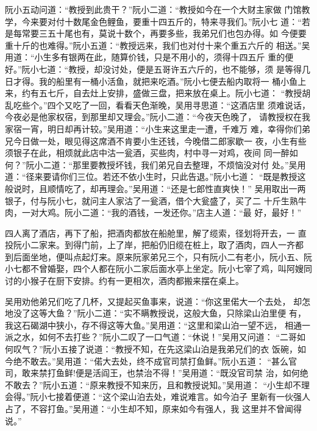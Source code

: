 阮小五动问道：“教授到此贵干？”阮小二道：“教授如今在一个大财主家做
门馆教学，今来要对付十数尾金色鲤鱼，要重十四五斤的，特来寻我们。”阮小七
道：“若是每常要三五十尾也有，莫说十数个，再要多些，我弟兄们也包办得。如
今便要重十斤的也难得。”阮小五道：“教授远来，我们也对付十来个重五六斤的
相送。”吴用道：“小生多有银两在此，随算价钱，只是不用小的，须得十四五斤
重的便好。”阮小七道：“教授，却没讨处，便是五哥许五六斤的，也不能够，须
是等得几日才得。我的船里有一桶小活鱼，就把来吃酒。”阮小七便去船内取将一
桶小鱼上来，约有五七斤，自去灶上安排，盛做三盘，把来放在桌上。阮小七道：
“教授胡乱吃些个。”四个又吃了一回，看看天色渐晚，吴用寻思道：“这酒店里
须难说话，今夜必是他家权宿，到那里却又理会。”阮小二道：“今夜天色晚了，
请教授权在我家宿一宵，明日却再计较。”吴用道：“小生来这里走一遭，千难万
难，幸得你们弟兄今日做一处，眼见得这席酒不肯要小生还钱，今晚借二郎家歇一
夜，小生有些须银子在此，相烦就此店中沽一瓮酒，买些肉，村中寻一对鸡，夜间
同一醉如何？”阮小二道：“那里要教授坏钱，我们弟兄自去整理，不烦恼没对付
处。”吴用道：“径来要请你们三位。若还不依小生时，只此告退。”阮小七道：
“既是教授这般说时，且顺情吃了，却再理会。”吴用道：“还是七郎性直爽快！”
吴用取出一两银子，付与阮小七，就问主人家沽了一瓮酒，借个大瓮盛了，买了二
十斤生熟牛肉，一对大鸡。阮小二道：“我的酒钱，一发还你。”店主人道：“最
好，最好！”

四人离了酒店，再下了船，把酒肉都放在船舱里，解了缆索，径划将开去，一
直投阮小二家来。到得门前，上了岸，把船仍旧缆在桩上，取了酒肉，四人一齐都
到后面坐地，便叫点起灯来。原来阮家弟兄三个，只有阮小二有老小，阮小五、阮
小七都不曾婚娶，四个人都在阮小二家后面水亭上坐定。阮小七宰了鸡，叫阿嫂同
讨的小猴子在厨下安排。约有一更相次，酒肉都搬来摆在桌上。

吴用劝他弟兄们吃了几杯，又提起买鱼事来，说道：“你这里偌大一个去处，
却怎地没了这等大鱼？”阮小二道：“实不瞒教授说，这般大鱼，只除梁山泊里便
有，我这石碣湖中狭小，存不得这等大鱼。”吴用道：“这里和梁山泊一望不远，
相通一派之水，如何不去打些？”阮小二叹了一口气道：“休说！”吴用又问道：
“二哥如何叹气？”阮小五接了说道：“教授不知，在先这梁山泊是我弟兄们的衣
饭碗，如今绝不敢去。”吴用道：“偌大去处，终不成官司禁打鱼鲜。”阮小五道：
“甚么官司，敢来禁打鱼鲜!便是活阎王，也禁治不得！”吴用道：“既没官司禁
治，如何绝不敢去？”阮小五道：“原来教授不知来历，且和教授说知。”吴用道：
“小生却不理会得。”阮小七接着便道：“这个梁山泊去处，难说难言。如今泊子
里新有一伙强人占了，不容打鱼。”吴用道：“小生却不知，原来如今有强人，我
这里并不曾闻得说。”

